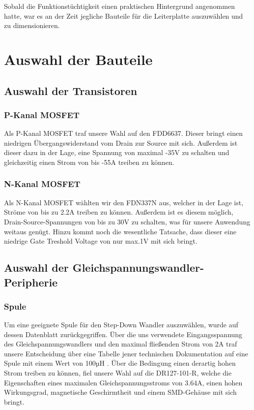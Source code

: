 Sobald die Funktionstüchtigkeit einen praktischen Hintergrund angenommen hatte,
war es an der Zeit jegliche Bauteile für die Leiterplatte auszuwählen und zu dimensionieren.


\newpage
\section{Auswahl der Bauteile}

\subsection{Auswahl der Transistoren}
\subsubsection{P-Kanal MOSFET }

Als P-Kanal MOSFET traf unsere Wahl auf den FDD6637.
Dieser bringt einen niedrigen Übergangswiderstand vom Drain zur Source mit sich.
Außerdem ist dieser dazu in der Lage, eine Spannung von maximal -35V zu schalten und gleichzeitig einen Strom von bis -55A treiben zu können.

\subsubsection{N-Kanal MOSFET }

Als N-Kanal MOSFET wählten wir den FDN337N aus, welcher in der Lage ist, Ströme von bis zu 2.2A treiben zu können.
Außerdem ist es diesem möglich, Drain-Source-Spannungen von bis zu 30V zu schalten, was für unsere Anwendung weitaus genügt.
Hinzu kommt noch die wesentliche Tatsache, dass dieser eine niedrige Gate Treshold Voltage von nur max.1V mit sich bringt.

\subsection{Auswahl der Gleichspannungswandler-Peripherie}

\subsubsection{Spule }
Um eine geeignete Spule für den Step-Down Wandler auszuwählen, wurde auf dessen Datenblatt zurückgegriffen.
Über die uns verwendete Eingangsspannung des Gleichspannungswandlers und den maximal fließenden Strom von 2A
traf unsere Entscheidung über eine Tabelle jener technischen Dokumentation auf eine Spule mit einem Wert von 100µH .
Über die Bedingung einen derartig hohen Strom treiben zu können, fiel unsere Wahl auf die DR127-101-R,
welche die Eigenschaften eines maximalen Gleichspannungsstroms von 3.64A, einen hohen Wirkungsgrad, magnetische Geschirmtheit und einem SMD-Gehäuse mit sich bringt.

